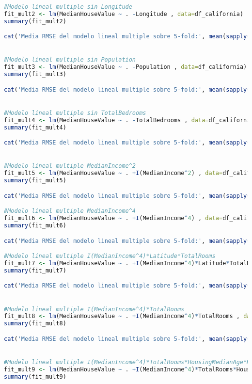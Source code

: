 \begin{lstlisting}[language=R]
#Modelo lineal multiple sin Longitude
fit_mult2 <- lm(MedianHouseValue ~ . -Longitude , data=df_california)
summary(fit_mult2)

cat('Media RMSE del modelo lineal multiple sobre 5-fold:', mean(sapply(1:5, run_lm_fold, 'california', fit_mult2), fill=T))


#Modelo lineal multiple sin Population
fit_mult3 <- lm(MedianHouseValue ~ . -Population , data=df_california)
summary(fit_mult3)

cat('Media RMSE del modelo lineal multiple sobre 5-fold:', mean(sapply(1:5, run_lm_fold, 'california', fit_mult3), fill=T))


#Modelo lineal multiple sin TotalBedrooms
fit_mult4 <- lm(MedianHouseValue ~ . -TotalBedrooms , data=df_california)
summary(fit_mult4)

cat('Media RMSE del modelo lineal multiple sobre 5-fold:', mean(sapply(1:5, run_lm_fold, 'california', fit_mult4), fill=T))


#Modelo lineal multiple MedianIncome^2
fit_mult5 <- lm(MedianHouseValue ~ . +I(MedianIncome^2) , data=df_california)
summary(fit_mult5)

cat('Media RMSE del modelo lineal multiple sobre 5-fold:', mean(sapply(1:5, run_lm_fold, 'california', fit_mult5), fill=T))

#Modelo lineal multiple MedianIncome^4
fit_mult6 <- lm(MedianHouseValue ~ . +I(MedianIncome^4) , data=df_california)
summary(fit_mult6)

cat('Media RMSE del modelo lineal multiple sobre 5-fold:', mean(sapply(1:5, run_lm_fold, 'california', fit_mult6), fill=T))

#Modelo lineal multiple I(MedianIncome^4)*Latitude*TotalRooms
fit_mult7 <- lm(MedianHouseValue ~ . +I(MedianIncome^4)*Latitude*TotalRooms , data=df_california)
summary(fit_mult7)

cat('Media RMSE del modelo lineal multiple sobre 5-fold:', mean(sapply(1:5, run_lm_fold, 'california', fit_mult7), fill=T))


#Modelo lineal multiple I(MedianIncome^4)*TotalRooms
fit_mult8 <- lm(MedianHouseValue ~ . +I(MedianIncome^4)*TotalRooms , data=df_california)
summary(fit_mult8)

cat('Media RMSE del modelo lineal multiple sobre 5-fold:', mean(sapply(1:5, run_lm_fold, 'california', fit_mult8), fill=T))


#Modelo lineal multiple I(MedianIncome^4)*TotalRooms*HousingMedianAge*Households
fit_mult9 <- lm(MedianHouseValue ~ . +I(MedianIncome^4)*TotalRooms*HousingMedianAge*Households , data=df_california)
summary(fit_mult9)


\end{lstlisting}
